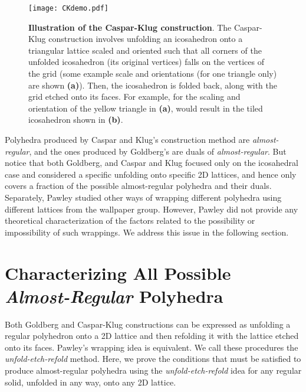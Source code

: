 \documentclass[11pt]{article}
\newcommand{\1}{\mathds{1}}
\begin{document}
\begin{figure}[h!]
\centering
\texttt{[image: CKdemo.pdf]}
\caption[Illustration of the Caspar-Klug construction]{ \textbf{Illustration of the Caspar-Klug construction}. The Caspar-Klug construction involves unfolding an icosahedron onto a triangular lattice scaled and oriented such that all corners of the unfolded icosahedron (its original vertices) falls on the vertices of the grid (some example scale and orientations (for one triangle only) are shown \textbf{(a)}). Then, the icosahedron is folded back, along with the grid etched onto its faces. For example, for the scaling and orientation of the yellow triangle in \textbf{(a)}, would result in the tiled icosahedron shown in \textbf{(b)}.}   
\label{fig:assemblytheory:CKdemo}
\end{figure}

Polyhedra produced by Caspar and Klug's construction method are \emph{almost-regular}, and the ones produced by Goldberg's are duals of \emph{almost-regular}. But notice that both Goldberg, and Caspar and Klug focused only on the icosahedral case and considered a specific unfolding onto specific 2D lattices, and hence only covers a fraction of the possible almost-regular polyhedra and their duals. Separately, Pawley \cite{Pawley_1961} studied other ways of wrapping different polyhedra using different lattices from the wallpaper group. However, Pawley did not provide any theoretical characterization of the factors related to the possibility or impossibility of such wrappings. We address this issue in the following section. 


\section{Characterizing All Possible \emph{Almost-Regular} Polyhedra}
\label{sec:assemblytheory:enumeration}
Both Goldberg and Caspar-Klug constructions can be expressed as unfolding a regular polyhedron onto a 2D lattice and then refolding it with the lattice etched onto its faces. Pawley's wrapping idea is equivalent. We call these procedures the \emph{unfold-etch-refold} method. Here, we prove the conditions that must be satisfied to produce almost-regular polyhedra using the \emph{unfold-etch-refold} idea for any regular solid, unfolded in any way, onto any 2D lattice.
\end{document}
